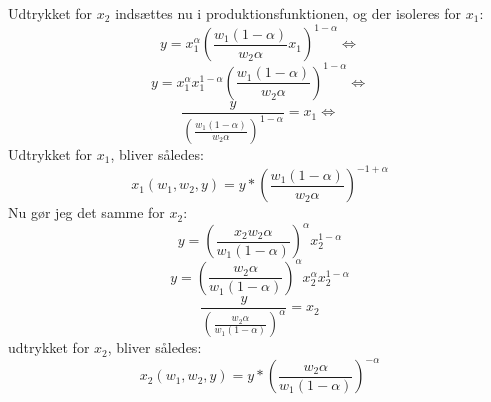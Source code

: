 \documentclass{article}
\begin{document}
Udtrykket for $x_2$ indsættes nu i produktionsfunktionen, og der isoleres for $x_1$:
\begin{equation}
    y=x_1^\alpha\left(\frac{w_1(1-\alpha)}{w_2 \alpha} x_1\right)^{1-\alpha} \Leftrightarrow
\end{equation}
\begin{equation}
    y=x_1^\alpha x_1^{1-\alpha}\left(\frac{w_1(1-\alpha)}{w_2 \alpha}\right)^{1-\alpha} \Leftrightarrow
\end{equation}
\begin{equation}
    \frac{y}{\left(\frac{w_1(1-\alpha)}{w_2 \alpha}\right)^{1-\alpha}}=x_1 \Leftrightarrow
\end{equation}
Udtrykket for $x_1$, bliver således:
\begin{equation}
    x_1(w_1, w_2, y) = y *\left(\frac{w_1(1-\alpha)}{w_2 \alpha}\right)^{-1+\alpha}
\end{equation}
Nu gør jeg det samme for $x_2$:
\begin{equation}
    y=\left(\frac{x_2 w_2 \alpha}{w_1(1-\alpha)}\right)^\alpha x_2^{1-\alpha}
\end{equation}
\begin{equation}
    y=\left(\frac{w_2 \alpha}{w_1(1-\alpha)}\right)^\alpha x_2^\alpha x_2^{1-\alpha}
\end{equation}
\begin{equation}
    \frac{y}{\left(\frac{w_2 \alpha}{w_1(1-\alpha)}\right)^\alpha}=x_2
\end{equation}
udtrykket for $x_2$, bliver således:
\begin{equation}
    x_2(w_1, w_2, y) = y *\left(\frac{w_2 \alpha}{w_1(1-\alpha)}\right)^{-\alpha}
\end{equation}
\end{document}
